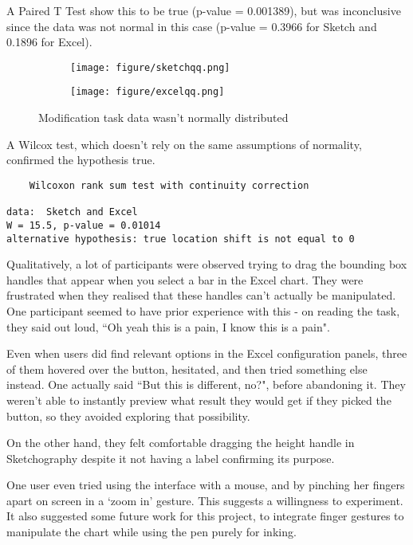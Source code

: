 A Paired T Test show this to be true (p-value = 0.001389), but was inconclusive since the data was not normal in this case (p-value = 0.3966 for Sketch and 0.1896 for Excel). 

\begin{figure}[H]
		\centering
		\begin{subfigure}[b]{0.4\textwidth}
			\texttt{[image: figure/sketchqq.png]}
		\end{subfigure}
		\begin{subfigure}[b]{0.4\textwidth}
			\texttt{[image: figure/excelqq.png]}
		\end{subfigure}
		\caption{Modification task data wasn't normally distributed}
	\end{figure}

A Wilcox test, which doesn't rely on the same assumptions of normality, confirmed the hypothesis true.

\begin{verbatim}
	Wilcoxon rank sum test with continuity correction

data:  Sketch and Excel
W = 15.5, p-value = 0.01014
alternative hypothesis: true location shift is not equal to 0
\end{verbatim}

Qualitatively, a lot of participants were observed trying to drag the bounding box handles that appear when you select a bar in the Excel chart. They were frustrated when they realised that these handles can't actually be manipulated. One participant seemed to have prior experience with this - on reading the task, they said out loud, ``Oh yeah this is a pain, I know this is a pain".

Even when users did find relevant options in the Excel configuration panels, three of them hovered over the button, hesitated, and then tried something else instead. One actually said ``But this is different, no?", before abandoning it. They weren't able to instantly preview what result they would get if they picked the button, so they avoided exploring that possibility. 

On the other hand, they felt comfortable dragging the height handle in Sketchography despite it not having a label confirming its purpose.

One user even tried using the interface with a mouse, and by pinching her fingers apart on screen in a `zoom in' gesture. This suggests a willingness to experiment. It also suggested some future work for this project, to integrate finger gestures to manipulate the chart while using the pen purely for inking.

